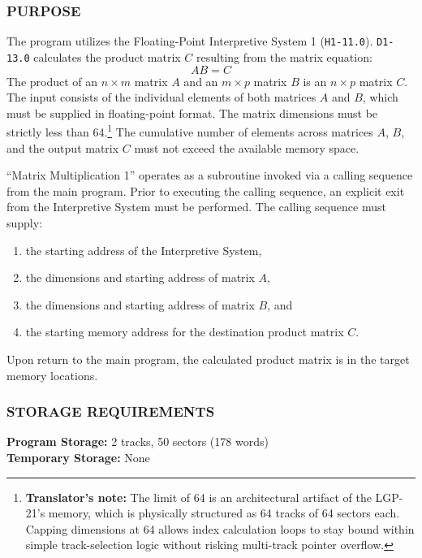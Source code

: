 \documentclass{article}
\begin{document}
\subsubsection*{PURPOSE}
The program utilizes the Floating-Point Interpretive System 1 (\texttt{H1-11.0}). \texttt{D1-13.0} calculates the product matrix $C$ resulting from the matrix equation:
\begin{equation}
    AB = C
\end{equation}
The product of an $n \times m$ matrix $A$ and an $m \times p$ matrix $B$ is an $n \times p$ matrix $C$. The input consists of the individual elements of both matrices $A$ and $B$, which must be supplied in floating-point format. The matrix dimensions must be strictly less than 64.\footnote{\textbf{Translator's note:} The limit of 64 is an architectural artifact of the LGP-21's memory, which is physically structured as 64 tracks of 64 sectors each. Capping dimensions at 64 allows index calculation loops to stay bound within simple track-selection logic without risking multi-track pointer overflow.} The cumulative number of elements across matrices $A$, $B$, and the output matrix $C$ must not exceed the available memory space.

``Matrix Multiplication 1'' operates as a subroutine invoked via a calling sequence from the main program. Prior to executing the calling sequence, an explicit exit from the Interpretive System must be performed. The calling sequence must supply: 
\begin{enumerate}
	\item the starting address of the Interpretive System,
	\item the dimensions and starting address of matrix $A$,
	\item the dimensions and starting address of matrix $B$, and
	\item the starting memory address for the destination product matrix $C$.
\end{enumerate} 
\noindent
Upon return to the main program, the calculated product matrix is in the target memory locations.

\subsubsection*{STORAGE REQUIREMENTS}
\noindent
\textbf{Program Storage:} 2 tracks, 50 sectors (178 words) \\
\textbf{Temporary Storage:} None
\end{document}
